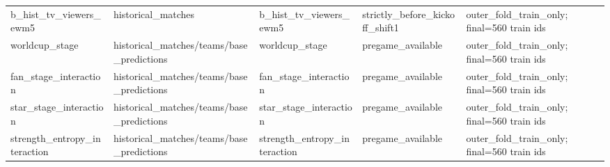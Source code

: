 {\begin{longtable}{p{}p{}p{}p{}p{}}
b\_\allowbreak{}hist\_\allowbreak{}tv\_\allowbreak{}viewers\_\allowbreak{}ewm5 & historical\_\allowbreak{}matches & b\_\allowbreak{}hist\_\allowbreak{}tv\_\allowbreak{}viewers\_\allowbreak{}ewm5 & strictly\_\allowbreak{}before\_\allowbreak{}kickoff\_\allowbreak{}shift1 & outer\_\allowbreak{}fold\_\allowbreak{}train\_\allowbreak{}only;\allowbreak{} final=560 train ids \\
worldcup\_\allowbreak{}stage & historical\_\allowbreak{}matches/\allowbreak{}teams/\allowbreak{}base\_\allowbreak{}predictions & worldcup\_\allowbreak{}stage & pregame\_\allowbreak{}available & outer\_\allowbreak{}fold\_\allowbreak{}train\_\allowbreak{}only;\allowbreak{} final=560 train ids \\
fan\_\allowbreak{}stage\_\allowbreak{}interaction & historical\_\allowbreak{}matches/\allowbreak{}teams/\allowbreak{}base\_\allowbreak{}predictions & fan\_\allowbreak{}stage\_\allowbreak{}interaction & pregame\_\allowbreak{}available & outer\_\allowbreak{}fold\_\allowbreak{}train\_\allowbreak{}only;\allowbreak{} final=560 train ids \\
star\_\allowbreak{}stage\_\allowbreak{}interaction & historical\_\allowbreak{}matches/\allowbreak{}teams/\allowbreak{}base\_\allowbreak{}predictions & star\_\allowbreak{}stage\_\allowbreak{}interaction & pregame\_\allowbreak{}available & outer\_\allowbreak{}fold\_\allowbreak{}train\_\allowbreak{}only;\allowbreak{} final=560 train ids \\
strength\_\allowbreak{}entropy\_\allowbreak{}interaction & historical\_\allowbreak{}matches/\allowbreak{}teams/\allowbreak{}base\_\allowbreak{}predictions & strength\_\allowbreak{}entropy\_\allowbreak{}interaction & pregame\_\allowbreak{}available & outer\_\allowbreak{}fold\_\allowbreak{}train\_\allowbreak{}only;\allowbreak{} final=560 train ids \\
\end{longtable}
\par
}
